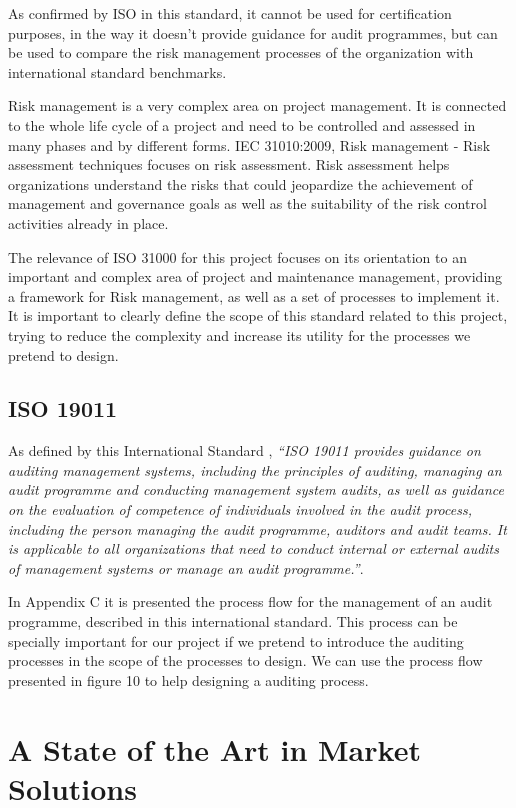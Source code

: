 As confirmed by ISO in this standard, it cannot be used for certification purposes, in the way it doesn't provide guidance for audit programmes, but can be used to compare the risk management processes of the organization with international standard benchmarks.\par
Risk management is a very complex area on project management. It is connected to the whole life cycle of a project and need to be controlled and assessed in many phases and by different forms. IEC 31010:2009, Risk management - Risk assessment techniques focuses on risk assessment. Risk assessment helps organizations understand the risks that could jeopardize the achievement of management and governance goals as well as the suitability of the risk control activities already in place.\cite{IEC31010}\par
The relevance of ISO 31000 for this project focuses on its orientation to an important and complex area of project and maintenance management, providing a framework for Risk management, as well as a set of processes to implement it. It is important to clearly define the scope of this standard related to this project, trying to reduce the complexity and increase its utility for the processes we pretend to design.


\subsection{ISO 19011}

As defined by this International Standard \cite{ISO19011}, \textit{``ISO 19011 provides guidance on auditing management systems, including the principles of auditing, managing an audit programme and conducting management system audits, as well as guidance on the evaluation of competence of individuals involved in the audit process, including the person managing the audit programme, auditors and audit teams. It is applicable to all organizations that need to conduct internal or external audits of management systems or manage an audit programme.''}.\par
In Appendix C it is presented the process flow for the management of an audit programme, described in this international standard. This process can be specially important for our project if we pretend to introduce the auditing processes in the scope of the processes to design. We can use the process flow presented in figure 10 to help designing a auditing process.


\section{A State of the Art in Market Solutions}

